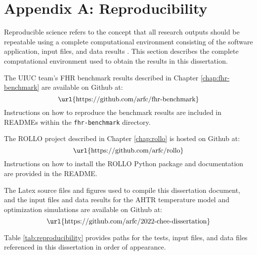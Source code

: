 \chapter{Appendix A: Reproducibility} 
\renewcommand{\thetable}{A.\arabic{table}}
\setcounter{table}{0}
\renewcommand{\thefigure}{A.\arabic{figure}}
\setcounter{figure}{0}

Reproducible science refers to the concept that all research outputs should be 
repeatable using a complete computational environment consisting of the software 
application, input files, and data results \cite{novak_multiscale_2020}.
This section describes the complete computational environment used to obtain the 
results in this dissertation.

The UIUC team's \gls{FHR} benchmark results described in Chapter \ref{chap:fhr-benchmark} 
are available on Github at: 
\begin{equation*}
\mbox{\url{https://github.com/arfc/fhr-benchmark}}
\end{equation*}
Instructions on how to reproduce the benchmark results are included in READMEs within 
the \texttt{fhr-benchmark} directory. 

The \gls{ROLLO} project described in Chapter \ref{chap:rollo} is hosted on Github at: 
\begin{equation*}
    \mbox{\url{https://github.com/arfc/rollo}}
\end{equation*}
Instructions on how to install the \gls{ROLLO} Python package and documentation are 
provided in the README. 

The Latex source files and figures used to compile this dissertation document, and 
the input files and data results for the AHTR temperature model and optimization 
simulations are available on Github at:  
\begin{equation*}
    \mbox{\url{https://github.com/arfc/2022-chee-dissertation}}
\end{equation*}

Table \ref{tab:reproducibility} provides paths for the tests, input files, and data 
files referenced in this dissertation in order of appearance. 

